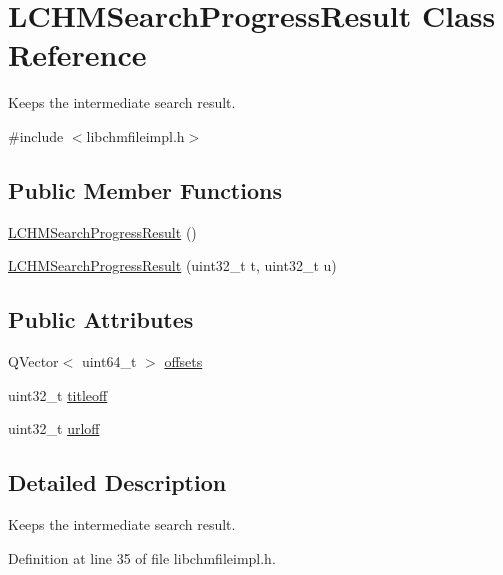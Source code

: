 \hypertarget{classLCHMSearchProgressResult}{\section{L\+C\+H\+M\+Search\+Progress\+Result Class Reference}
\label{classLCHMSearchProgressResult}
}


Keeps the intermediate search result.  




{\ttfamily \#include $<$libchmfileimpl.\+h$>$}

\subsection*{Public Member Functions}
\begin{DoxyCompactItemize}
\item 
\hyperlink{classLCHMSearchProgressResult_a28cacf330571082db47a995550a60be5}{L\+C\+H\+M\+Search\+Progress\+Result} ()
\item 
\hyperlink{classLCHMSearchProgressResult_a0df7cec7b48b0a5364b05bd3207ca97a}{L\+C\+H\+M\+Search\+Progress\+Result} (uint32\+\_\+t t, uint32\+\_\+t u)
\end{DoxyCompactItemize}
\subsection*{Public Attributes}
\begin{DoxyCompactItemize}
\item 
Q\+Vector$<$ uint64\+\_\+t $>$ \hyperlink{classLCHMSearchProgressResult_a72f86fd02076b9234fbf3b7418740757}{offsets}
\item 
uint32\+\_\+t \hyperlink{classLCHMSearchProgressResult_a19efd6e530de64b24d8241e63879b10e}{titleoff}
\item 
uint32\+\_\+t \hyperlink{classLCHMSearchProgressResult_a5adc806eecbe534531e56d8c3bec9bee}{urloff}
\end{DoxyCompactItemize}


\subsection{Detailed Description}
Keeps the intermediate search result. 

Definition at line 35 of file libchmfileimpl.\+h.




